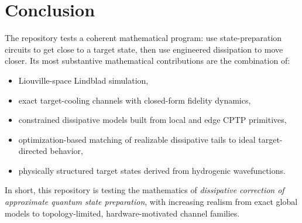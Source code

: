 \documentclass[11pt,a4paper]{article}
\begin{document}
\section{Conclusion}
The repository tests a coherent mathematical program: use state-preparation circuits to get close to a target state, then use engineered dissipation to move closer. Its most substantive mathematical contributions are the combination of:
\begin{itemize}
  \item Liouville-space Lindblad simulation,
  \item exact target-cooling channels with closed-form fidelity dynamics,
  \item constrained dissipative models built from local and edge CPTP primitives,
  \item optimization-based matching of realizable dissipative tails to ideal target-directed behavior,
  \item physically structured target states derived from hydrogenic wavefunctions.
\end{itemize}

In short, this repository is testing the mathematics of \emph{dissipative correction of approximate quantum state preparation}, with increasing realism from exact global models to topology-limited, hardware-motivated channel families.
\end{document}
